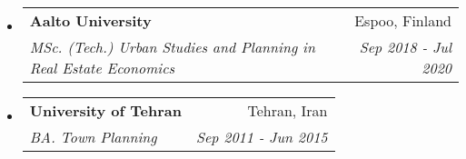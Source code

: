 \documentclass[a4paper,11pt]{article}
\makeatletter
\newcommand{\resumeItem}[1]{
	\item\small{#1}
}
\newcommand{\resumeItemListStart}{\begin{itemize}[rightmargin=0.11in]}
\newcommand{\resumeItemListEnd}{\end{itemize}}
\newcommand{\resumeTrioHeading}[3]{
	\item\small{
		\begin{tabular*}{0.96\textwidth}[t]{
				l@{\extracolsep{\fill}}c@{\extracolsep{\fill}}r
			}
			\textbf{#1} & \textit{#2} & #3
		\end{tabular*}
	}
}
\newcommand{\resumeQuadHeading}[4]{
	\item
	\begin{tabular*}{0.96\textwidth}[t]{l@{\extracolsep{\fill}}r}
		\textbf{#1} & #2 \\
		\textit{\small#3} & \textit{\small #4} \\
	\end{tabular*}
}
\newcommand{\resumeHeadingListStart}{
	\begin{itemize}[leftmargin=0.15in, label={}]
	}
\newcommand{\resumeHeadingListEnd}{\end{itemize}}
\makeatother
\begin{document}
	\resumeHeadingListStart{}
	\resumeQuadHeading{Aalto University}{Espoo, Finland}
	{MSc. (Tech.) Urban Studies and Planning in Real Estate Economics}{Sep 2018 - Jul 2020}
	\resumeHeadingListEnd{}

	\resumeHeadingListStart{}
	\resumeQuadHeading{University of Tehran}{Tehran, Iran}
	{BA. Town Planning}{Sep 2011 - Jun 2015}
	\resumeHeadingListEnd{}
	
	
	
%	
	
	
\end{document}
